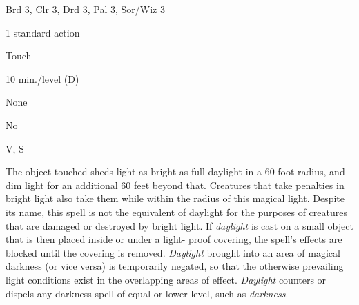 
\begin{description*}
\item[Level:] Brd 3, Clr 3, Drd 3, Pal 3, Sor/Wiz 3
\item[Casting Time:] 1 standard action
\item[Range:] Touch
\item[Duration:] 10 min./level (D)
\item[Saving Throw:] None
\item[Spell Resistance:] No
\item[Components:] V, S
\end{description*}

The object touched sheds light as bright as full daylight in a 60-foot radius,
and dim light for an additional 60 feet beyond that. Creatures that take penalties
in bright light also take them while within the radius of this magical light. Despite
its name, this spell is not the equivalent of daylight for the purposes of creatures
that are damaged or destroyed by bright light.
If \textit{daylight} is cast on a small object that is then placed inside or under
a light- proof covering, the spell's effects are blocked until the covering is
removed.
\textit{Daylight} brought into an area of magical darkness (or vice versa) is temporarily
negated, so that the otherwise prevailing light conditions exist in the overlapping
areas of effect.
\textit{Daylight} counters or dispels any darkness spell of equal or lower level,
such as \textit{darkness}.